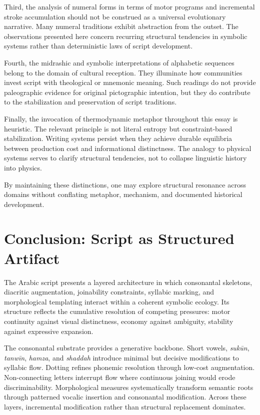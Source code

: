 \documentclass[11pt]{article}
\begin{document}
Third, the analysis of numeral forms in terms of motor programs and incremental stroke accumulation should not be construed as a universal evolutionary narrative. Many numeral traditions exhibit abstraction from the outset. The observations presented here concern recurring structural tendencies in symbolic systems rather than deterministic laws of script development.

Fourth, the midrashic and symbolic interpretations of alphabetic sequences belong to the domain of cultural reception. They illuminate how communities invest script with theological or mnemonic meaning. Such readings do not provide paleographic evidence for original pictographic intention, but they do contribute to the stabilization and preservation of script traditions.

Finally, the invocation of thermodynamic metaphor throughout this essay is heuristic. The relevant principle is not literal entropy but constraint-based stabilization. Writing systems persist when they achieve durable equilibria between production cost and informational distinctness. The analogy to physical systems serves to clarify structural tendencies, not to collapse linguistic history into physics.

By maintaining these distinctions, one may explore structural resonance across domains without conflating metaphor, mechanism, and documented historical development.

\section{Conclusion: Script as Structured Artifact}

The Arabic script presents a layered architecture in which consonantal skeletons, diacritic augmentation, joinability constraints, syllabic marking, and morphological templating interact within a coherent symbolic ecology. Its structure reflects the cumulative resolution of competing pressures: motor continuity against visual distinctness, economy against ambiguity, stability against expressive expansion.

The consonantal substrate provides a generative backbone. Short vowels, \textit{sukūn}, \textit{tanwīn}, \textit{hamza}, and \textit{shaddah} introduce minimal but decisive modifications to syllabic flow. Dotting refines phonemic resolution through low-cost augmentation. Non-connecting letters interrupt flow where continuous joining would erode discriminability. Morphological measures systematically transform semantic roots through patterned vocalic insertion and consonantal modification. Across these layers, incremental modification rather than structural replacement dominates.
\end{document}
